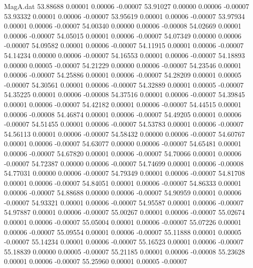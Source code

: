 \begin{filecontents}{MagA.dat}
  53.88688    0.00001    0.00006   -0.00007
  53.91027    0.00000    0.00006   -0.00007
  53.93332    0.00001    0.00006   -0.00007
  53.95619    0.00001    0.00006   -0.00007
  53.97934    0.00001    0.00006   -0.00007
  54.00340    0.00000    0.00006   -0.00008
  54.02669    0.00001    0.00006   -0.00007
  54.05015    0.00001    0.00006   -0.00007
  54.07349    0.00000    0.00006   -0.00007
  54.09582    0.00001    0.00006   -0.00007
  54.11915    0.00001    0.00006   -0.00007
  54.14234    0.00000    0.00006   -0.00007
  54.16553    0.00001    0.00006   -0.00007
  54.18893    0.00000    0.00005   -0.00007
  54.21229    0.00000    0.00006   -0.00007
  54.23546    0.00001    0.00006   -0.00007
  54.25886    0.00001    0.00006   -0.00007
  54.28209    0.00001    0.00005   -0.00007
  54.30561    0.00001    0.00006   -0.00007
  54.32889    0.00001    0.00005   -0.00007
  54.35225    0.00001    0.00006   -0.00008
  54.37516    0.00001    0.00006   -0.00007
  54.39845    0.00001    0.00006   -0.00007
  54.42182    0.00001    0.00006   -0.00007
  54.44515    0.00001    0.00006   -0.00008
  54.46874    0.00001    0.00006   -0.00007
  54.49205    0.00001    0.00006   -0.00007
  54.51455    0.00001    0.00006   -0.00007
  54.53783    0.00001    0.00006   -0.00007
  54.56113    0.00001    0.00006   -0.00007
  54.58432    0.00000    0.00006   -0.00007
  54.60767    0.00001    0.00006   -0.00007
  54.63077    0.00000    0.00006   -0.00007
  54.65481    0.00001    0.00006   -0.00007
  54.67820    0.00001    0.00006   -0.00007
  54.70066    0.00001    0.00006   -0.00007
  54.72387    0.00000    0.00006   -0.00007
  54.74699    0.00001    0.00006   -0.00008
  54.77031    0.00000    0.00006   -0.00007
  54.79349    0.00001    0.00006   -0.00007
  54.81708    0.00001    0.00006   -0.00007
  54.84051    0.00001    0.00006   -0.00007
  54.86333    0.00001    0.00006   -0.00007
  54.88688    0.00000    0.00006   -0.00007
  54.90959    0.00001    0.00006   -0.00007
  54.93321    0.00001    0.00006   -0.00007
  54.95587    0.00001    0.00006   -0.00007
  54.97887    0.00001    0.00006   -0.00007
  55.00267    0.00001    0.00006   -0.00007
  55.02674    0.00001    0.00006   -0.00007
  55.05004    0.00001    0.00006   -0.00007
  55.07226    0.00001    0.00006   -0.00007
  55.09554    0.00001    0.00006   -0.00007
  55.11888    0.00001    0.00005   -0.00007
  55.14234    0.00001    0.00006   -0.00007
  55.16523    0.00001    0.00006   -0.00007
  55.18839    0.00000    0.00005   -0.00007
  55.21185    0.00001    0.00006   -0.00008
  55.23628    0.00001    0.00006   -0.00007
  55.25960    0.00001    0.00005   -0.00007

\end{filecontents}
